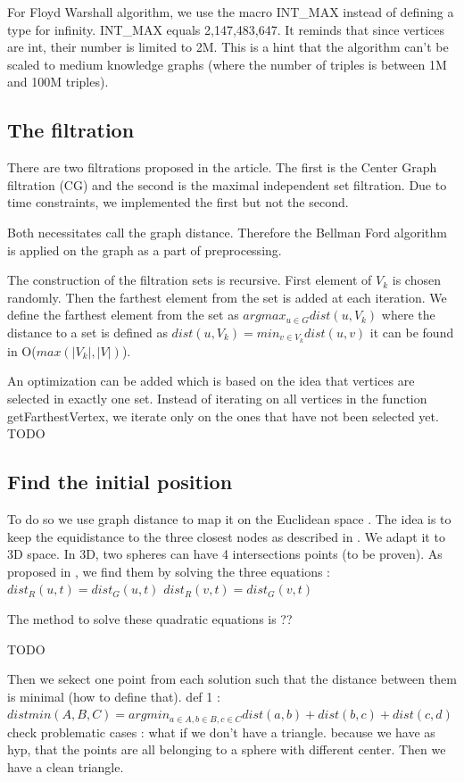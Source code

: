 \documentclass{article}
\begin{document}
For Floyd Warshall algorithm, we use the macro INT_MAX instead of defining a type for infinity. INT_MAX equals 2,147,483,647. It reminds that since vertices are int, their number is limited to 2M. This is a hint that the algorithm can't be scaled to medium knowledge graphs (where the number of triples is between 1M and 100M triples). 

\subsection{The filtration}
There are two filtrations proposed in the article. 
The first is the Center Graph filtration (CG) and the second is the maximal independent set filtration.
Due to time constraints, we implemented the first but not the second. 

Both necessitates call the graph distance. Therefore the Bellman Ford algorithm is applied on the graph as a part of preprocessing. 

The construction of the filtration sets is recursive.
First element of $V_{k}$ is chosen randomly. 
Then the farthest element from the set is added at each iteration. 
We define the farthest element from the set as 
$argmax_{u \in G} dist(u, V_{k})$
where the distance to a set is defined as $dist(u, V_{k}) = min_{v \in V_{k}} dist(u, v)$
it can be found in O($ max(|V_{k}|, |V|)$). 

An optimization can be added which is based on the idea that vertices are selected in exactly one set. Instead of iterating on all vertices in the function getFarthestVertex, we iterate only on the ones that have not been selected yet. TODO

\subsection{Find the initial position}
To do so we use graph distance to map it on the Euclidean space . The idea is to keep the equidistance to the three closest nodes as described in \cite{gajer00}. 
We adapt it to 3D space. 
In 3D, two spheres can have 4 intersections points (to be proven).
As proposed in \cite{gajer00},  we find them by solving the three equations : 
$dist_{R}(u, t) = dist_{G}(u, t)$
$dist_{R}(v, t) = dist_{G}(v, t)$

The method to solve these quadratic equations is ?? 

TODO

Then we sekect one point from each solution such that the distance between them is minimal (how to define that). 
def 1 : $distmin(A, B, C) = argmin_{a \in A, b \in B, c \in C}  dist(a, b) + dist(b, c) + dist(c, d)$
check problematic cases : what if we don't have a triangle.
because we have as hyp, that the points are all belonging to a sphere with different center. Then we have a clean triangle. 
\end{document}
